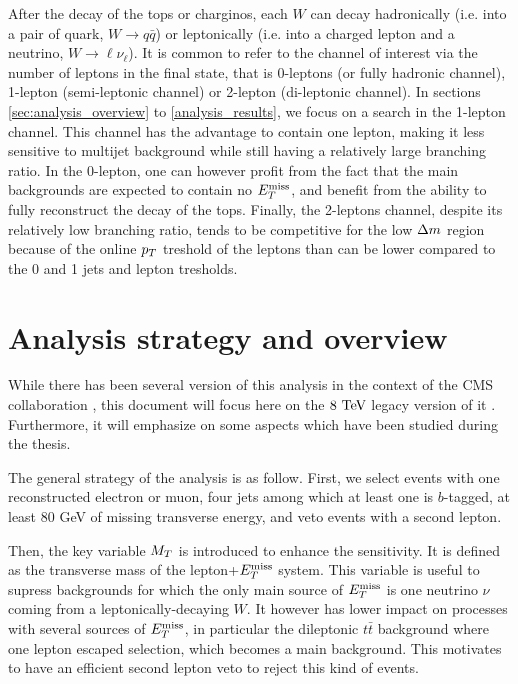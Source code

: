     After the decay of the tops or charginos, each $W$ can decay hadronically (i.e. into
    a pair of quark, $W \rightarrow q\bar{q}$) or leptonically (i.e. into a charged
    lepton and a neutrino, $W \rightarrow \ell \nu_{\ell}$). It is common to refer to
    the channel of interest via the number of leptons in the final state, that is 0-leptons
    (or fully hadronic channel), 1-lepton (semi-leptonic channel) or 2-lepton (di-leptonic
    channel). In sections \ref{sec:analysis_overview} to \ref{analysis_results}, we focus on
    a search in the 1-lepton channel. This channel has the advantage to contain one
    lepton, making it less sensitive to multijet background while still having a relatively
    large branching ratio. In the 0-lepton, one can however profit from the fact that
    the main backgrounds are expected to contain no $E_T^\text{miss}$, and benefit from the ability
    to fully reconstruct the decay of the tops. Finally, the 2-leptons channel, despite
    its relatively low branching ratio, tends to be competitive for the low $\Delta m$
    region because of the online $p_T$ treshold of the leptons than can be lower compared
    to the 0 and 1 jets and lepton tresholds.

    \section{Analysis strategy and overview \label{sec:analysis_overview}}

    While there has been several version of this analysis in the context of the CMS
    collaboration \cite{SUS-12-023-PAS, SUS-13-011-PUB, SUS-14-015-PAS}, this document
    will focus here on the $8~\text{TeV}$ legacy version of it \cite{SUS-14-015-PAS}. Furthermore,
    it will emphasize on some aspects which have been studied during the thesis.

    The general strategy of the analysis is as follow. First, we select events with one
    reconstructed electron or muon, four jets among which at least one is $b$-tagged,
    at least 80 GeV of missing transverse energy, and veto events with a second lepton.

    Then, the key variable $M_T$ is introduced to enhance the sensitivity. It is defined as
    the transverse mass of the lepton+$E_T^\text{miss}$ system. This variable is useful to supress
    backgrounds for which the only main source of $E_T^\text{miss}$ is one neutrino $\nu$
    coming from a leptonically-decaying $W$. It however has lower impact on processes with
    several sources of $E_T^\text{miss}$, in particular the dileptonic $t\bar{t}$ background where one
    lepton escaped selection, which becomes a main background. This motivates to have an
    efficient second lepton veto to reject this kind of events.

